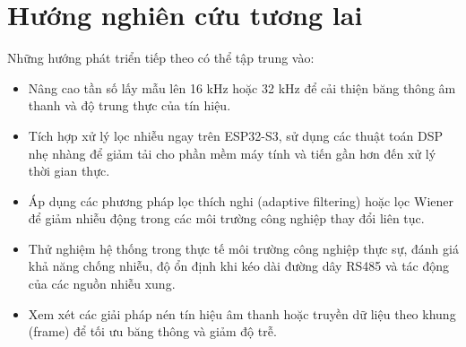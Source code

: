 \documentclass[a4paper]{report}
\begin{document}
\section{Hướng nghiên cứu tương lai}
Những hướng phát triển tiếp theo có thể tập trung vào:
\begin{itemize}
    \item Nâng cao tần số lấy mẫu lên 16 kHz hoặc 32 kHz để cải thiện băng thông âm thanh và độ trung thực của tín hiệu.
    \item Tích hợp xử lý lọc nhiễu ngay trên ESP32-S3, sử dụng các thuật toán DSP nhẹ nhàng để giảm tải cho phần mềm máy tính và tiến gần hơn đến xử lý thời gian thực.
    \item Áp dụng các phương pháp lọc thích nghi (adaptive filtering) hoặc lọc Wiener để giảm nhiễu động trong các môi trường công nghiệp thay đổi liên tục.
    \item Thử nghiệm hệ thống trong thực tế môi trường công nghiệp thực sự, đánh giá khả năng chống nhiễu, độ ổn định khi kéo dài đường dây RS485 và tác động của các nguồn nhiễu xung.
    \item Xem xét các giải pháp nén tín hiệu âm thanh hoặc truyền dữ liệu theo khung (frame) để tối ưu băng thông và giảm độ trễ.
\end{itemize}

\printbibliography[title={Tài liệu tham khảo}]
\end{document}
